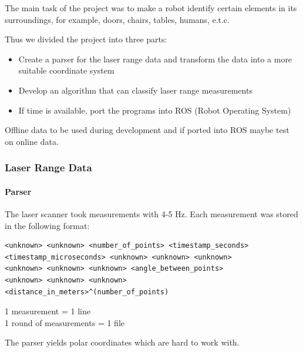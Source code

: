 \documentclass{beamer}
\begin{document}
\begin{frame}[shrink]
The main task of the project was to make a robot identify certain elements in its surroundings, for example, doors, chairs, tables, humans, e.t.c.

\vspace{10pt}

Thus we divided the project into three parts:

\begin{itemize}
\pause
\item{Create a parser for the laser range data and transform the data into a more suitable coordinate system}
\pause  
\item{Develop an algorithm that can classify laser range measurements}
\pause  
\item{If time is available, port the programs into ROS (Robot Operating System)}
\end{itemize}
\pause
Offline data to be used during development and if ported into ROS maybe test on online data.

\end{frame}

\begin{frame}[fragile]
\frametitle{Laser Range Data}
\framesubtitle{Parser}

The laser scanner took measurements with 4-5 Hz. Each measurement was stored in the following format:
\begin{verbatim}
<unknown> <unknown> <number_of_points> <timestamp_seconds>
<timestamp_microseconds> <unknown> <unknown> <unknown>
<unknown> <unknown> <unknown> <angle_between_points>
<unknown> <unknown> <unknown>
<distance_in_meters>^(number_of_points)
\end{verbatim}

1 measurement = 1 line
\\
1 round of measurements = 1 file

\pause
\vspace{10pt}

The parser yields polar coordinates which are hard to work with.

\end{frame}
\end{document}
